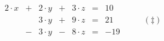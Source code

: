 \documentclass[11pt]{article}
\begin{document}
\[
\begin{array}{lclcrcrr}
2 \cdot x & + & 2 \cdot y & + &  3 \cdot z & = &  10 \\
          &   & 3 \cdot y & + &  9 \cdot z & = &  21 & \qquad (\ddagger)\\
          & - & 3 \cdot y & - &  8 \cdot z & = & -19
\end{array}
\]
\end{document}
